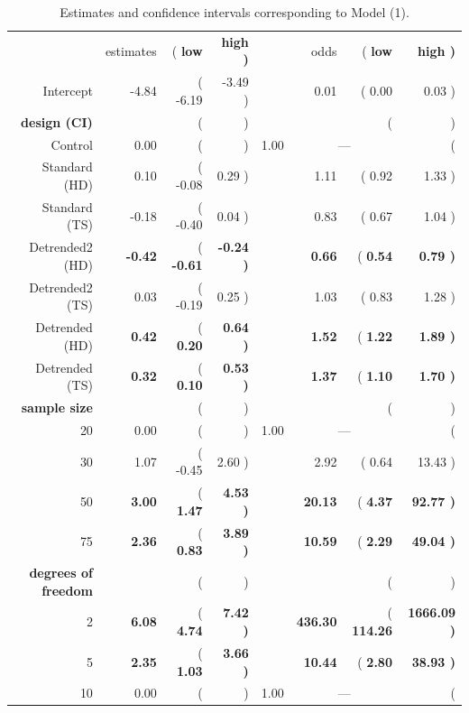 \documentclass{article}\usepackage[]{graphicx}\usepackage[]{color}
\newcommand{\hh}[1]{{\color{magenta} #1}}
\begin{document}
% 
% 
\begin{table}[ht]
\caption{\label{tab:coefs} \hh{Estimates and confidence intervals corresponding to Model (1).}}
\centering
\begin{tabular}{rr>{ (}r@{, }r<{) }rr>{ (}r@{, }r<{) }}
\cline{2-4}\cline{6-8}
& estimates & \bf low & \bf high && odds &  \bf low & \bf high \\ 
 \cline{2-4} \cline{6-8}
  Intercept & -4.84 & -6.19 & -3.49 && 0.01 & 0.00 & 0.03 \\ [3pt]
\multicolumn{1}{r}{\bf design (CI)} \\  
Control & 0.00 & \multicolumn{2}{c}{---} && 1.00 & \multicolumn{2}{c}{---}\\
Standard (HD) & 0.10 & -0.08 & 0.29 && 1.11 & 0.92 & 1.33 \\ 
  Standard (TS) & -0.18 & -0.40 & 0.04 && 0.83 & 0.67 & 1.04 \\ [2pt]
    Detrended2 (HD) & \bf -0.42 & \bf -0.61 & \bf  -0.24 && \bf 0.66 & \bf 0.54 & \bf  0.79 \\ 
  Detrended2 (TS) & 0.03 & -0.19 & 0.25 && 1.03 & 0.83 & 1.28 \\ [2pt]
%
Detrended (HD) & \bf 0.42 & \bf 0.20 & \bf 0.64 && \bf  1.52 & \bf 1.22 & \bf 1.89 \\ 
  Detrended (TS) & \bf 0.32 & \bf 0.10 & \bf 0.53 && \bf 1.37 & \bf 1.10 & \bf 1.70 \\ [3pt]
\multicolumn{1}{r}{\bf sample size} \\  
20 & 0.00 & \multicolumn{2}{c}{---} && 1.00 & \multicolumn{2}{c}{---}\\
  30 & 1.07 & -0.45 & 2.60 && 2.92 & 0.64 & 13.43 \\ 
  50 & \bf 3.00 & \bf 1.47 & \bf 4.53 && \bf 20.13 & \bf 4.37 & \bf 92.77 \\ 
  75 & \bf 2.36 & \bf 0.83 & \bf 3.89 && \bf 10.59 & \bf 2.29 & \bf 49.04 \\ [3pt]
\multicolumn{1}{r}{\bf degrees of freedom} \\  
 2 & \bf 6.08 & \bf 4.74 & \bf 7.42 && \bf 436.30 & \bf  114.26 & \bf 1666.09 \\ 
 5 & \bf 2.35 & \bf 1.03 & \bf  3.66 && \bf 10.44 & \bf 2.80 & \bf 38.93 \\ 
10 & 0.00 & \multicolumn{2}{c}{---} && 1.00 & \multicolumn{2}{c}{---}\\
\cline{2-4} \cline{6-8}
\end{tabular}
\end{table}
\end{document}
